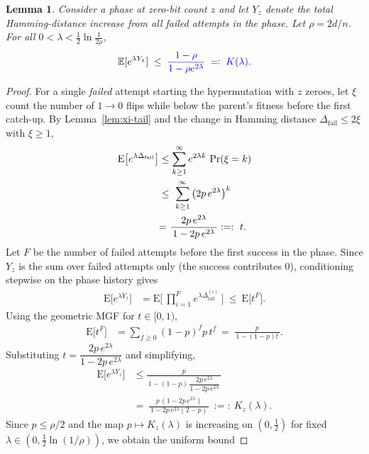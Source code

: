 \documentclass[lettersize,journal]{IEEEtran}
\newcommand{\EE}{\text{E}}
\newtheorem{lemma}{Lemma}
\begin{document}
{\begin{lemma}\label{lem:phase-mgf}
	Consider a phase at zero-bit count $z$ and let $Y_z$ denote the total 
	Hamming-distance increase from all failed attempts in the phase.  
	Let $\rho = 2d/n$.  
	For all $0<\lambda<\tfrac12\ln\frac{1}{2\rho}$,
	\[
	\mathbb{E}[e^{\lambda Y_z}] 
	\;\le\; 
	\textcolor{blue}{\frac{1-\rho}{1-\rho e^{2\lambda}}
	\;\eqqcolon\; K(\lambda).}
	\]
\end{lemma}

\begin{proof}
	For a single \emph{failed} attempt starting the hypermutation with $z$ zeroes, let $\xi$ count the number of $1\!\to 0$ flips while below the parent's fitness before the first catch-up.
	By Lemma~\ref{lem:xi-tail} and the change in Hamming distance $\Delta_{\mathrm{fail}}\le 2\xi$ with $\xi\ge 1$,
	\begin{align*}
		\EE\!\left[e^{\lambda \Delta_{\mathrm{fail}}}\right]
		&\le \sum_{k\ge 1}^{\infty} e^{2\lambda k}\,\Pr(\xi=k)
		\\ &\le\ \sum_{k\ge 1}^{\infty} \big(2p\,e^{2\lambda}\big)^{k}
		\\ &\textcolor{black}{=}\ \frac{2p\,e^{2\lambda}}{\,1-2p\,e^{2\lambda}\,}:=:\ t.
	\end{align*}
	Let $F$ be the number of failed attempts before the first success in the phase. Since $Y_z$ is the sum over failed attempts only (the success contributes $0$), conditioning stepwise on the phase history gives
	\begin{align*}
		\EE\!\big[e^{\lambda Y_z}\big]
		&=\EE\!\Big[\ \prod_{i=1}^{F} e^{\lambda \Delta_{\mathrm{fail}}^{(i)}}\ \Big]
		\ \le\ \EE\!\big[t^{F}\big].
	\end{align*}
	Using the geometric MGF for $t\in[0,1)$,
	\begin{align*}
		\EE\!\big[t^{F}\big]
		&=
		 \sum_{f\ge 0} (1-p)^f p\, t^f
		\ =\ \frac{p}{\,1-(1-p)t\,}.
	\end{align*}
	Substituting $t=\dfrac{2p\,e^{2\lambda}}{1-2p\,e^{2\lambda}}$ and simplifying,
	\begin{align*}
		\EE\!\big[e^{\lambda Y_z}\big]
		&\le \frac{p}{\,1-(1-p)\,\dfrac{2p\,e^{2\lambda}}{1-2p\,e^{2\lambda}}\,}
		\\ &=\ \frac{p\,(1-2p\,e^{2\lambda})}{\,1-2p\,e^{2\lambda}(2-p)\,}
		\ :=:\ K_z(\lambda).
	\end{align*}
	Since $p\le \rho/2$ and the map $p\mapsto K_z(\lambda)$ is increasing on $(0,\tfrac12)$ for fixed $\lambda\in(0,\tfrac12\ln(1/\rho))$, we obtain the uniform bound

\end{proof}}
\end{document}
